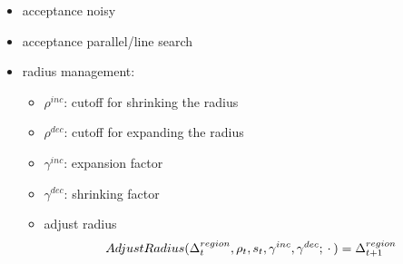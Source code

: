 \begin{itemize}
\begin{itemize}
            \item acceptance noisy
            \item acceptance parallel/line search
            \item radius management:
                \begin{itemize}
                    \item $\rho^{inc}$: cutoff for shrinking the radius
                    \item $\rho^{dec}$: cutoff for expanding the radius
                    \item $\gamma^{inc}$: expansion factor
                    \item $\gamma^{dec}$: shrinking factor
                    \item adjust radius
                        \begin{align}
                            AdjustRadius(\Delta^{region}_t,\rho_t,s_t,\gamma^{inc},\gamma^{dec};\hspace{0.2em}\cdot\hspace{0.2em}) = \Delta_{t+1}^{region}
                        \end{align}
                \end{itemize}
        \end{itemize}





\end{itemize}
